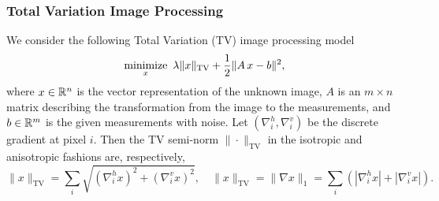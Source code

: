 \subsubsection{Total Variation Image Processing}
We consider the following Total Variation (TV) image processing model
\begin{equation}\label{eqn:tvl2}
\Min_{x}~\lambda \|x\|_{\text{TV}} + \frac{1}{2} \|A\,x - b\|^2,
\end{equation}
where $x\in \mathbb{R}^n$ is the vector representation of the unknown image, $A$ is an $m \times n$ matrix describing the transformation from the image to the measurements, and $b \in \mathbb{R}^m$ is the given measurements with noise. Let $(\nabla_i^h,\nabla_i^v)$ be the discrete gradient at pixel $i$. Then the TV semi-norm $\|\cdot\|_{\text{TV}}$ in the isotropic and anisotropic fashions are, respectively,
\begin{equation}
\|x\|_{\text{TV}} = {\sum_{i} \sqrt{(\nabla_i^h x)^2 + (\nabla_i^v x)^2},}\quad  \| {x\|_{\text{TV}} = \|} \nabla x\|_1 = \sum_{i} \left(|\nabla_i^h x| + |\nabla_i^v x|\right).
\end{equation}

